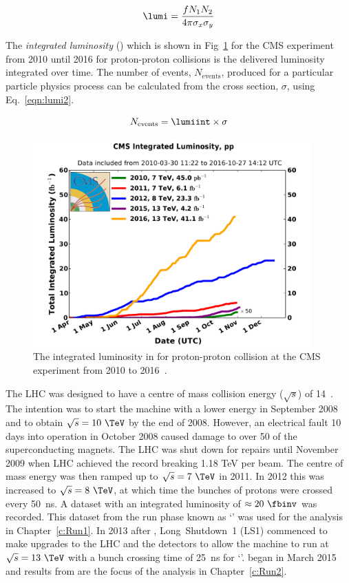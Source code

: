 \begin{equation}
\lumi = \frac{f{N}_{1}{N}_{2}}{4\pi\sigma_{x}\sigma_{y}}
\label{eqn:lumi1}
\end{equation}

The \emph{integrated luminosity} (\lumiint) which is shown in Fig~\ref{fig:Lumi} for the CMS experiment from 2010 until 2016 for proton-proton collisions is the delivered luminosity integrated over time. The number of events, $N_{\textrm{events}}$, produced for a particular particle physics process can be calculated from the cross section, $\sigma$, using Eq.~\ref{eqn:lumi2}.

\begin{equation}
N_{\textrm{events}} = \lumiint \times \sigma
\label{eqn:lumi2}
\end{equation}

\begin{figure}[ht!]
\centering
    \includegraphics[width=0.95\textwidth]{images/int_lumi_cumulative_pp_2.pdf}
    \caption{The integrated luminosity in \fbinv for proton-proton collision at the CMS experiment from 2010 to 2016~\cite{lumiplotref}.}
    \label{fig:Lumi}
\end{figure}

The LHC was designed to have a centre of mass collision energy ($\sqrt{s}$) of 14~\TeV. The intention was to start the machine with a lower energy in September 2008 and to obtain $\sqrt{s} = 10~\TeV$ by the end of 2008. However, an electrical fault 10 days into operation in October 2008 caused damage to over 50 of the superconducting magnets. The LHC was shut down for repairs until November 2009 when LHC achieved the record breaking 1.18 TeV per beam. The centre of mass energy was then ramped up to $\sqrt{s} = 7~\TeV$ in 2011. In 2012 this was increased to $\sqrt{s} = 8~\TeV$, at which time the bunches of protons were crossed every 50~ns. A dataset with an integrated luminosity of $\approx 20~\fbinv$ was recorded. This dataset from the run phase known as `\runone' was used for the analysis in Chapter~\ref{c:Run1}. In 2013 after \runone, Long~Shutdown~1 (LS1) commenced to make upgrades to the LHC and the detectors to allow the machine to run at $\sqrt{s} = 13~\TeV$ with a bunch crossing time of 25~ns for `\runtwo'. \runtwo began in March 2015 and results from \runtwo are the focus of the analysis in Chapter~\ref{c:Run2}.

